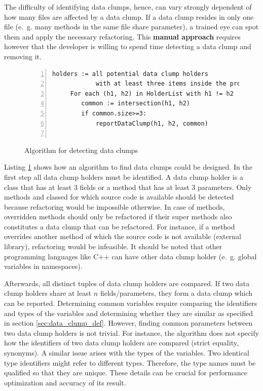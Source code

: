 The difficulty of identifying data clumps, hence, can vary strongly dependent of how many files are affected by a data clump. If a data clump resides in only one file (e.~g. many methods in the same file share parameter), a trained eye can spot them and apply the necessary refactoring. This \textbf{manual approach} requires however that the developer is willing to spend time detecting a data clump and removing it. 


\begin{figure}[ht!]
\begin{lstlisting}[numbers=left]
    holders := all potential data clump holders 
            with at least three items inside the project
     For each (h1, h2) in HolderList with h1 != h2
        common := intersection(h1, h2)
        if common.size>=3:
            reportDataClump(h1, h2, common)
        

\end{lstlisting}
\caption{Algorithm for detecting data clumps}
\label{lst:data_clumps_algo}
\end{figure}






Listing \ref{lst:data_clumps_algo} shows how an algorithm to find data clumps could be designed. In the first step all data clump holders must be identified.
A data clump holder is a class that has at least 3 fields or a method that has at least 3 parameters.  Only methods and classed for which source code is available should be detected because refactoring would be impossible otherwise. In case of methods, overridden methods should only be refactored if their super methods also constitutes a data clump that can be refactored.  For instance, if a method overrides another method of which the source code is not available (external library), refactoring would be infeasible. 
It should be noted that other programming languages like C++ can have other data clump holder (e.~g. global variables in namespaces). 


Afterwards, all distinct tuples of data clump holders are compared. If two data clump holders share at least $n$ fields/parameters, they form a data clump which can be reported. Determining common variables require comparing the identifiers and types of the variables and determining whether they are similar as specified in section \ref{sec:data_clump_def}. However, finding common parameters between two data clump holders is not trivial.  For instance, the algorithm does not specify how the identifiers of two data clump holders are compared (strict equality, synonyms). A similar issue arises with the types of the variables.  Two identical type identifiers might refer to different types. Therefore, the type names must be qualified so that they are unique. These details can be crucial for performance optimization and accuracy of its result. 



